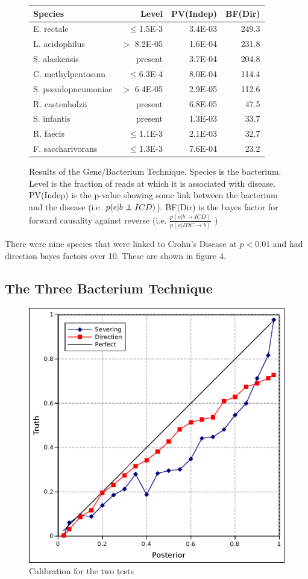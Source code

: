\documentclass[a4paper]{article}
\newcommand\independent{\protect\mathpalette{\protect\independenT}{\perp}}
\def\independenT#1#2{\mathrel{\rlap{$#1#2$}\mkern2mu{#1#2}}}
\begin{document}
\begin{figure}[b]
  \begin{tabular}{@{}lrrr}
    Species & Level & PV(Indep) & BF(Dir) \\
\hline
E. rectale & $\leq$1.5E-3 & 3.4E-03 & 249.3\\
L. acidophilus & $>$ 8.2E-05 & 1.6E-04 & 231.8\\
S. alaskensis & present & 3.7E-04 & 204.8\\
C. methylpentosum & $\leq$6.3E-4 & 8.0E-04 & 114.4\\
S. pseudopneumoniae & $>$ 6.4E-05 & 2.9E-05 & 112.6\\
R. castenholzii & present & 6.8E-05 & 47.5\\
S. infantis & present & 1.3E-03 & 33.7\\
R. faecis & $\leq$1.1E-3 & 2.1E-03 & 32.7\\
F. saccharivorans & $\leq$1.3E-3 & 7.6E-04 & 23.2 \\
  \end{tabular}
  \caption{ Results of the Gene/Bacterium Technique.  Species is the
    bacterium.  Level is the fraction of reads at which it is
    associated with disease.  PV(Indep) is the p-value showing some link
    between the bacterium and the disease (i.e. $p(e|b\independent
    ICD)$).  BF(Dir) is the bayes factor for forward causality against
    reverse (i.e. 
    $\frac{p(e|b\rightarrow ICD)}{p(e|IDC\rightarrow b)}$ ) } 
\end{figure}

There were nine species that were linked to Crohn's Disease at $p<0.01$
and had direction bayes factors over 10.  These are shown in figure 4.

\subsection{The Three Bacterium Technique}

\begin{figure}[b!]
  \includegraphics[width=.47\textwidth]{calib}
  \caption{Calibration for the two tests}
\end{figure}
\end{document}
